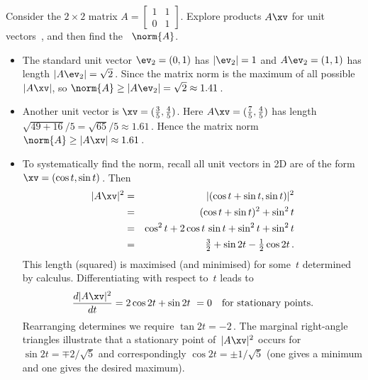 \begin{example} \label{eg:}
Consider the \(2\times2\) matrix \(A=\begin{bmatrix} 1&1\\0&1 \end{bmatrix}\).
Explore products \(A\xv\) for unit vectors~\xv, and then find the ~\(\norm{A}\).
\begin{itemize}
\item The standard unit vector \(\ev_2=(0,1)\) has \(|\ev_2|=1\) and \(A\ev_2=(1,1)\) has length \(|A\ev_2|=\sqrt2\)\,.
Since the matrix norm is the maximum of all possible~\(|A\xv|\), so \(\norm{A}\geq|A\ev_2|=\sqrt2\approx 1.41\)\,.
\item Another unit vector is \(\xv=(\tfrac35,\tfrac45)\).
Here \(A\xv=(\tfrac75,\tfrac45)\) has length \(\sqrt{49+16}/5=\sqrt{65}/5\approx1.61\)\,.
Hence the matrix norm \(\norm{A}\geq|A\xv|\approx 1.61\)\,.
\item To systematically find the norm, recall all unit vectors in 2D are of the form \(\xv=(\cos t,\sin t)\)\,.
Then
\begin{eqnarray*}
|A\xv|^2&=&|(\cos t+\sin t,\sin t)|^2
\\&=&(\cos t+\sin t)^2+\sin^2 t
\\&=&\cos^2 t+2\cos t\,\sin t+\sin^2t+\sin^2 t
\\&=&\tfrac32+\sin 2t-\tfrac12\cos 2t\,.
\end{eqnarray*}
This length (squared) is maximised (and minimised) for some~\(t\) determined by calculus.
Differentiating with respect to~\(t\)  leads to
\begin{equation*}
\frac{d|A\xv|^2}{dt}=2\cos2t+\sin 2t \ =0\quad\text{for stationary points.}
\end{equation*}
Rearranging determines we require \(\tan 2t=-2\)\,.
The marginal right-angle triangles illustrate that a stationary point of~\(|A\xv|^2\) occurs for \(\sin 2t=\mp2/\sqrt5\) and correspondingly \(\cos2t=\pm1/\sqrt5\) (one gives a minimum and one gives the desired maximum).

\end{itemize}
\end{example}
